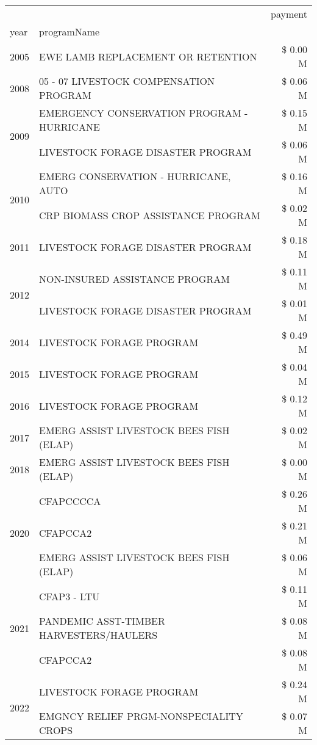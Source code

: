 \begin{tabular}{llr}
\toprule
 &  & payment \\
year & programName &  \\
\midrule
2005 & EWE LAMB REPLACEMENT OR RETENTION & \$ 0.00 M \\
\cline{1-3}
2008 & 05 - 07 LIVESTOCK COMPENSATION PROGRAM & \$ 0.06 M \\
\cline{1-3}
\multirow[t]{2}{*}{2009} & EMERGENCY CONSERVATION PROGRAM - HURRICANE & \$ 0.15 M \\
 & LIVESTOCK FORAGE DISASTER  PROGRAM & \$ 0.06 M \\
\cline{1-3}
\multirow[t]{2}{*}{2010} & EMERG CONSERVATION - HURRICANE, AUTO & \$ 0.16 M \\
 & CRP BIOMASS CROP ASSISTANCE PROGRAM & \$ 0.02 M \\
\cline{1-3}
2011 & LIVESTOCK FORAGE DISASTER PROGRAM & \$ 0.18 M \\
\cline{1-3}
\multirow[t]{2}{*}{2012} & NON-INSURED ASSISTANCE PROGRAM & \$ 0.11 M \\
 & LIVESTOCK FORAGE DISASTER PROGRAM & \$ 0.01 M \\
\cline{1-3}
2014 & LIVESTOCK FORAGE PROGRAM & \$ 0.49 M \\
\cline{1-3}
2015 & LIVESTOCK FORAGE PROGRAM & \$ 0.04 M \\
\cline{1-3}
2016 & LIVESTOCK FORAGE PROGRAM & \$ 0.12 M \\
\cline{1-3}
2017 & EMERG ASSIST LIVESTOCK BEES FISH (ELAP) & \$ 0.02 M \\
\cline{1-3}
2018 & EMERG ASSIST LIVESTOCK BEES FISH (ELAP) & \$ 0.00 M \\
\cline{1-3}
\multirow[t]{3}{*}{2020} & CFAPCCCCA & \$ 0.26 M \\
 & CFAPCCA2 & \$ 0.21 M \\
 & EMERG ASSIST LIVESTOCK BEES FISH (ELAP) & \$ 0.06 M \\
\cline{1-3}
\multirow[t]{3}{*}{2021} & CFAP3 - LTU & \$ 0.11 M \\
 & PANDEMIC ASST-TIMBER HARVESTERS/HAULERS & \$ 0.08 M \\
 & CFAPCCA2 & \$ 0.08 M \\
\cline{1-3}
\multirow[t]{2}{*}{2022} & LIVESTOCK FORAGE PROGRAM & \$ 0.24 M \\
 & EMGNCY RELIEF PRGM-NONSPECIALITY CROPS & \$ 0.07 M \\
\cline{1-3}
\bottomrule
\end{tabular}
